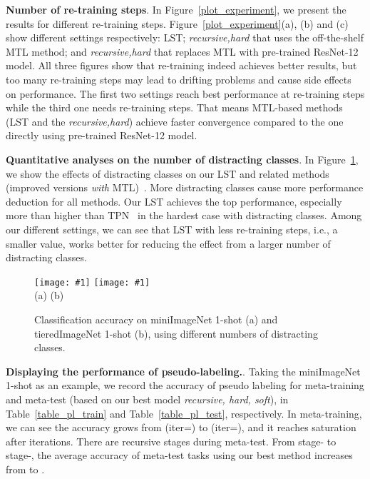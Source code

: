 \documentclass{article}
\newcommand{\myparagraph}[1]{\vspace{0.1em}\noindent\textbf{#1}}
\begin{document}
\myparagraph{Number of re-training steps}. In Figure~\ref{plot_experiment}, we present the results for different re-training steps. Figure~\ref{plot_experiment}(a), (b) and (c) show different settings respectively: LST; \emph{recursive,hard} that uses the off-the-shelf MTL method; and \emph{recursive,hard} that replaces MTL with pre-trained ResNet-12 model.
All three figures show that re-training indeed achieves better results, but too many re-training steps may lead to drifting problems and cause side effects on performance. The first two settings reach best performance at  re-training steps while the third one needs  re-training steps. That means MTL-based methods (LST and the \emph{recursive,hard}) achieve faster convergence compared to the one directly using pre-trained ResNet-12 model.


\myparagraph{Quantitative analyses on the number of distracting classes}. 
In Figure~\ref{distractors_experiment}, we show the effects of distracting classes on our LST and related methods (improved versions \emph{with} MTL)~\cite{RenICLR2018_semisupervised, TarvainenNIPS17mean_teacher}.
More distracting classes cause more performance deduction for all methods.
Our LST achieves the top performance, especially more than  higher than TPN~\cite{LiuICLR2019transductive} in the hardest case with  distracting classes. 
Among our different settings, we can see that LST with less re-training steps, i.e., a smaller  value, works better for reducing the effect from a larger number of distracting classes.
\begin{figure}[t]
\newcommand{\plotexpone}[1]{\texttt{[image: \#1]}}
\hspace*{0.5cm}
\plotexpone{plots/mini_plot.eps}
\hspace{1cm}
\plotexpone{plots/tiered_plot.eps}\\
\hspace*{3.30cm} (a) \hspace{6.55cm}(b)\\
\vspace{-0.5cm}
\caption{Classification accuracy on miniImageNet 1-shot (a) and tieredImageNet 1-shot (b), using different numbers of distracting classes.}
\vspace{-0.3cm}
\label{distractors_experiment}
\end{figure} 
\myparagraph{Displaying the performance of pseudo-labeling.}. Taking the miniImageNet 1-shot as an example, we record the accuracy of pseudo labeling for meta-training and meta-test (based on our best model \emph{recursive, hard, soft}), in Table~\ref{table_pl_train} and Table~\ref{table_pl_test}, respectively. 
In meta-training, we can see the accuracy grows from  (iter=) to  (iter=), and it reaches saturation after  iterations.
There are  recursive stages during meta-test. From stage- to stage-, the average accuracy of  meta-test tasks using our best method increases from  to . 
\end{document}
